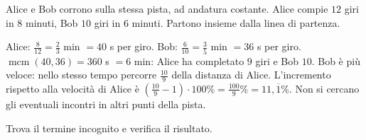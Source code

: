 \begin{esercizi}
\begin{esercizio}
\question Alice e Bob corrono sulla stessa pista, ad andatura costante. Alice compie $12$ giri in $8$ minuti, Bob $10$ giri in $6$ minuti. Partono insieme dalla linea di partenza.
\begin{solution}
Alice: $\frac8{12}=\frac23$ min $=40$ s per giro. Bob: $\frac6{10}=\frac35$ min $=36$ s per giro. $\operatorname{mcm}(40,36)=360$ s $=\boxed{6\text{ min}}$: Alice ha completato $9$ giri e Bob $10$. Bob è più veloce: nello stesso tempo percorre $\frac{10}{9}$ della distanza di Alice. L'incremento rispetto alla velocità di Alice è $(\frac{10}{9}-1)\cdot100\%=\boxed{\frac{100}{9}\%=11{,}\overline1\%}$. Non si cercano gli eventuali incontri in altri punti della pista.
\end{solution}
\end{esercizio}

\newpage{}

\begin{esercizio}
\question Trova il termine incognito e verifica il risultato.
\end{esercizio}
\end{esercizi}
